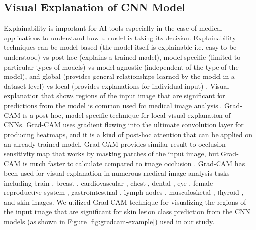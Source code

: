 \subsection{Visual Explanation of CNN Model}\label{sec:Grad-CAM}
Explainability is important for AI tools especially in the case of medical applications \cite{Vellido2020} to understand how a model is taking its decision. Explainability techniques can be model-based (the model itself is explainable i.e. easy to be understood) vs post hoc (explains a trained model), model-specific (limited to particular types of models) vs model-agnostic (independent of the type of the model), and global (provides general relationships learned by the model in a dataset level) vs local (provides explanations for individual input) \cite{VanderVelden2022}. Visual explanation that shows regions of the input image that are significant for predictions from the model is common used for medical image analysis \cite{VanderVelden2022}. Grad-CAM \cite{Selvaraju2020} is a post hoc, model-specific technique for local visual explanation of CNNs. Grad-CAM uses gradient flowing into the ultimate convolution layer for producing heatmaps, and it is a kind of post-hoc attention that can be applied on an already trained model. Grad-CAM provides similar result to occlusion sensitivity map \cite{10.1007/978-3-319-10590-1_53} that works by masking patches of the input image, but Grad-CAM is much faster to calculate compared to image occlusion \cite{Selvaraju2020}.  Grad-CAM has been used for visual explanation in numerous medical image analysis tasks including brain \cite{10.3389/fnins.2020.00630}, breast \cite{ElAdoui2020}, cardiovascular \cite{Candemir2020}, chest \cite{Brunese2020}, dental \cite{8977504}, eye \cite{Martins2020}, female reproductive system \cite{9098587}, gastrointestinal \cite{Itoh2020}, lymph nodes \cite{Ji2019}, musculosketal \cite{VonSchacky2020}, thyroid \cite{Lee2020}, and skin \cite{Zunair2020} images. We utilized Grad-CAM technique for visualizing the regions of the input image that are significant for skin lesion class prediction from the CNN models (as shown in Figure \ref{fig:gradcam-example}) used in our study. 

